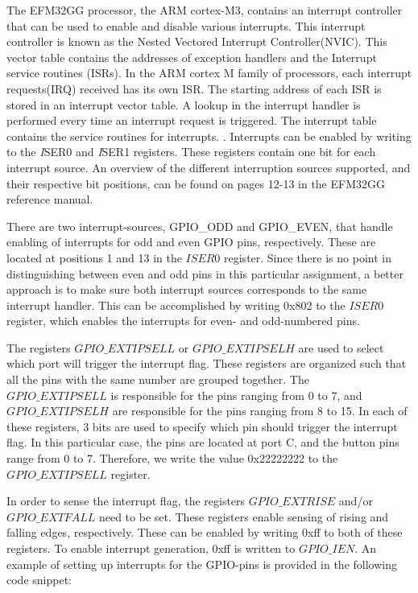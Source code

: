 The EFM32GG processor, the ARM cortex-M3, contains an interrupt controller that can be used to enable and disable various interrupts. This interrupt controller is known as the Nested Vectored Interrupt Controller(NVIC). This vector table contains the addresses of exception handlers and the Interrupt service routines (ISRs). In the ARM cortex M family of processors, each interrupt requests(IRQ) received has its own ISR. The starting address of each ISR is stored in an interrupt vector table. A lookup in the interrupt handler is performed every time an interrupt request is triggered. The interrupt table contains the service routines for interrupts. \cite{EFM32-int}. Interrupts can be enabled by writing to the \emph ISER0 and \emph ISER1 registers. These registers contain one bit for each interrupt source. An overview of the different interruption sources supported, and their respective bit positions, can be found on pages 12-13 in the EFM32GG reference manual.

There are two interrupt-sources, GPIO\_ODD and GPIO\_EVEN, that handle enabling of interrupts for odd and even GPIO pins, respectively. These are located at positions 1 and 13 in the $ISER0$ register. Since there is no point in distinguishing between even and odd pins in this particular assignment, a better approach is to make sure both interrupt sources corresponds to the same interrupt handler. This can be accomplished by writing 0x802 to the $ISER0$ register, which enables the interrupts for even- and odd-numbered pins.

The registers $GPIO\_EXTIPSELL$ or $GPIO\_EXTIPSELH$ are used to select which port will trigger the interrupt flag. These registers are organized such that all the pins with the same number are grouped together. The $GPIO\_EXTIPSELL$ is responsible for the pins ranging from 0 to 7, and $GPIO\_EXTIPSELH$ are responsible for the pins ranging from 8 to 15. In each of these registers, 3 bits are used to specify which pin should trigger the interrupt flag. In this particular case, the pins are located at port C, and the button pins range from 0 to 7. Therefore, we write the value 0x22222222 to the $GPIO\_EXTIPSELL$ register.

In order to sense the interrupt flag, the registers $GPIO\_EXTRISE$ and/or $GPIO\_EXTFALL$ need to be set. These registers enable sensing of rising and falling edges, respectively. These can be enabled by writing 0xff to both of these registers. To enable interrupt generation, 0xff is written to $GPIO\_IEN$. An example of setting up interrupts for the GPIO-pins is provided in the following code snippet: 

